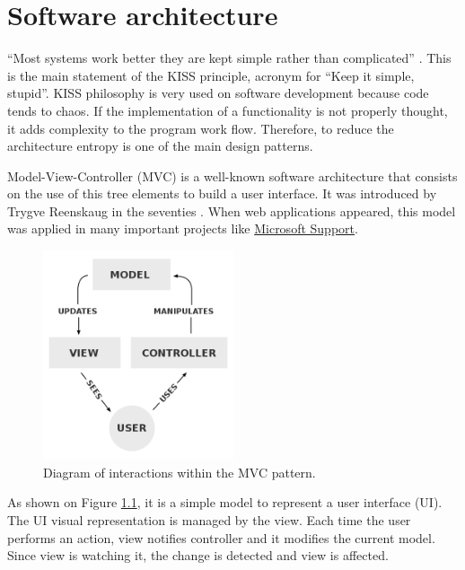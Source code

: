 \chapter{Software architecture}

“Most systems work better they are kept simple rather than complicated”
\cite{kiss-wiki}. This is the main statement of the KISS principle, acronym for
“Keep it simple, stupid”. KISS philosophy is very used on software development
because code tends to chaos. If the implementation of a functionality is not
properly thought, it adds complexity to the program work flow. Therefore, to
reduce the architecture entropy is one of the main design patterns.

Model-View-Controller (MVC) is a well-known software architecture that consists
on the use of this tree elements to build a user interface. It was introduced 
by Trygve Reenskaug in the seventies \cite{mvc-past-present}. When web
applications appeared, this model was applied in many important projects
like \href{https://support.microsoft.com}{Microsoft Support}. 


\begin{figure}[htb]
	\begin{center}
		\includegraphics[width=0.5\textwidth]{./figures/MVC-Process.png}
		\caption{Diagram of interactions within the MVC pattern.
				 \cite{mvc-wiki}}
		\label{F:mvc-interactions}
	\end{center}
\end{figure}

As shown on Figure \ref{F:mvc-interactions}, it is a simple model to represent
a user interface (UI). The UI visual representation is managed by the view.
Each time the user performs an action, view notifies controller and it modifies
the current model. Since view is watching it, the change is detected and view
is affected.

